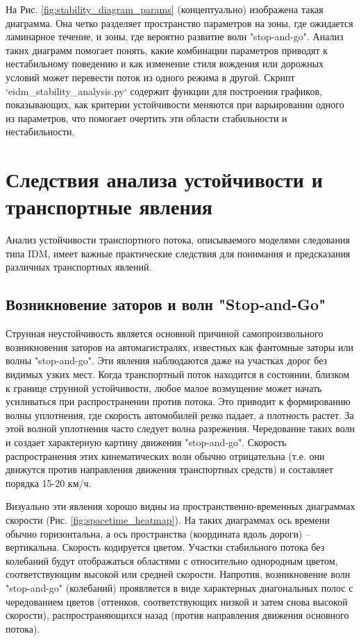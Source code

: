 \documentclass[12pt, a4paper]{article}
\begin{document}
На Рис. \ref{fig:stability_diagram_params} (концептуально) изображена такая диаграмма. Она четко разделяет пространство параметров на зоны, где ожидается ламинарное течение, и зоны, где вероятно развитие волн "stop-and-go". Анализ таких диаграмм помогает понять, какие комбинации параметров приводят к нестабильному поведению и как изменение стиля вождения или дорожных условий может перевести поток из одного режима в другой. Скрипт `eidm_stability_analysis.py` содержит функции для построения графиков, показывающих, как критерии устойчивости меняются при варьировании одного из параметров, что помогает очертить эти области стабильности и нестабильности.

\section{Следствия анализа устойчивости и транспортные явления}
\label{sec:implications_phenomena}

Анализ устойчивости транспортного потока, описываемого моделями следования типа IDM, имеет важные практические следствия для понимания и предсказания различных транспортных явлений.

\subsection{Возникновение заторов и волн "Stop-and-Go"}
\label{subsec:congestion_stop_go}

Струнная неустойчивость является основной причиной самопроизвольного возникновения заторов на автомагистралях, известных как фантомные заторы или волны "stop-and-go". Эти явления наблюдаются даже на участках дорог без видимых узких мест.
Когда транспортный поток находится в состоянии, близком к границе струнной устойчивости, любое малое возмущение может начать усиливаться при распространении против потока. Это приводит к формированию волны уплотнения, где скорость автомобилей резко падает, а плотность растет. За этой волной уплотнения часто следует волна разрежения. Чередование таких волн и создает характерную картину движения "stop-and-go".
Скорость распространения этих кинематических волн обычно отрицательна (т.е. они движутся против направления движения транспортных средств) и составляет порядка 15-20 км/ч.

Визуально эти явления хорошо видны на пространственно-временных диаграммах скорости (Рис. \ref{fig:spacetime_heatmap}). На таких диаграммах ось времени обычно горизонтальна, а ось пространства (координата вдоль дороги) – вертикальна. Скорость кодируется цветом. Участки стабильного потока без колебаний будут отображаться областями с относительно однородным цветом, соответствующим высокой или средней скорости. Напротив, возникновение волн "stop-and-go" (колебаний) проявляется в виде характерных диагональных полос с чередованием цветов (оттенков, соответствующих низкой и затем снова высокой скорости), распространяющихся назад (против направления движения основного потока).
\end{document}
